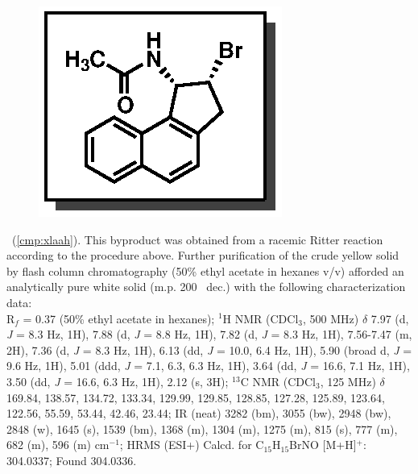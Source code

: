 \vspace{10pt}
\begin{figure}
  \vspace{-25pt}
  \begin{center}
    \includegraphics[scale=0.8]{chp_asymmetric/images/xlaah}
  \end{center}
  \vspace{-30pt}
\end{figure}
\noindent \textbf{\CMPxlaah}\ (\ref{cmp:xlaah}). This byproduct was obtained from a
racemic Ritter reaction according to the procedure above. Further purification
of the crude yellow solid by flash column chromatography (50\% ethyl acetate in
hexanes v/v) afforded an analytically pure white solid (m.p. 200 \degc\ dec.)
with the following characterization data:\\
R$_f$ = 0.37 (50\% ethyl acetate in hexanes); $^1$H NMR (CDCl$_3$, 500
MHz) $\delta$ 7.97 (d, \textit{J} = 8.3 Hz, 1H), 7.88 (d, \textit{J} = 8.8 Hz, 1H), 7.82 (d, \textit{J} = 8.3 Hz, 1H), 7.56-7.47 (m,
2H), 7.36 (d, \textit{J} = 8.3 Hz, 1H), 6.13 (dd, \textit{J} = 10.0, 6.4 Hz,
1H), 5.90 (broad d, \textit{J} = 9.6 Hz, 1H), 5.01 (ddd, \textit{J} = 7.1, 6.3, 6.3 Hz, 1H), 3.64 (dd, \textit{J} = 16.6, 7.1 Hz, 1H), 3.50 (dd, \textit{J} = 16.6, 6.3 Hz, 1H), 2.12 (s, 3H); $^{13}$C NMR (CDCl$_3$, 125 MHz) $\delta$ 169.84, 138.57, 134.72, 133.34, 129.99, 129.85, 128.85, 127.28, 125.89, 123.64, 122.56, 55.59, 53.44, 42.46, 23.44; IR (neat) 3282 (bm), 3055 (bw), 2948 (bw), 2848 (w), 1645 (s),
1539 (bm), 1368 (m), 1304 (m), 1275 (m), 815 (s), 777 (m), 682 (m), 596 (m) cm$^{-1}$; HRMS (ESI+) Calcd. for C$_{15}$H$_{15}$BrNO [M+H]$^+$: 304.0337;
Found 304.0336. 

